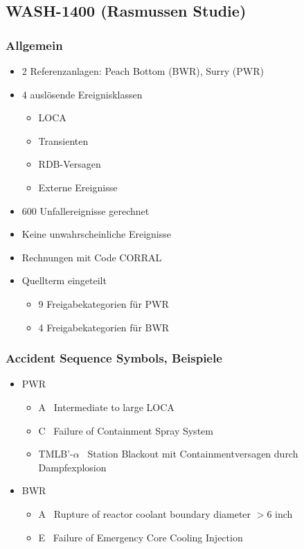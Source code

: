 \documentclass[12pt]{article}
\begin{document}
\subsection{WASH-1400 (Rasmussen Studie)}

\subsubsection{Allgemein}
\begin{itemize}
	\item 2 Referenzanlagen: Peach Bottom (BWR), Surry (PWR)
	\item 4 auslösende Ereignisklassen
		\begin{itemize}
			\item LOCA
			\item Transienten
			\item RDB-Versagen
			\item Externe Ereignisse
		\end{itemize}
	\item 600 Unfallereignisse gerechnet
	\item Keine unwahrscheinliche Ereignisse
	\item Rechnungen mit Code CORRAL
	\item Quellterm eingeteilt
		\begin{itemize}
			\item 9 Freigabekategorien für PWR
			\item 4 Freigabekategorien für BWR
		\end{itemize}
\end{itemize}

\subsubsection{Accident Sequence Symbols, Beispiele}
\begin{itemize}
	\item PWR
		\begin{itemize}
			\item A \textrightarrow\ Intermediate to large LOCA
			\item C \textrightarrow\ Failure of Containment Spray System
			\item TMLB'-\(\alpha\) \textrightarrow\ Station Blackout mit Containmentversagen durch Dampfexplosion
		\end{itemize}
	\item BWR
		\begin{itemize}
			\item A \textrightarrow\ Rupture of reactor coolant boundary diameter \(>6\) inch
			\item E \textrightarrow\ Failure of Emergency Core Cooling Injection
		\end{itemize}
\end{itemize}
\end{document}
